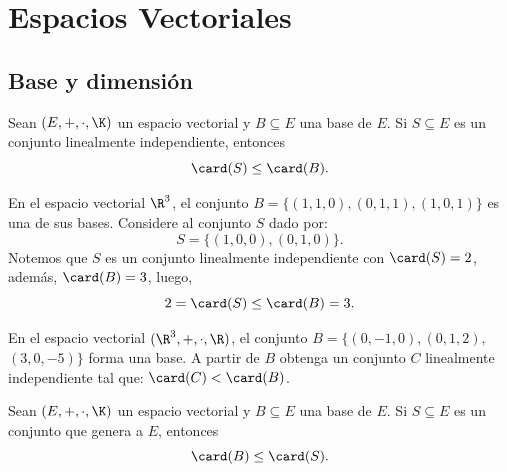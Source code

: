 \documentclass[compacto,10pt]{pubciencias-notas}
\begin{document}
\encabezado

\vspace*{-4mm}

\setcounter{section}{3}
\section{Espacios Vectoriales}
\setcounter{subsection}{6}
\subsection{Base y dimensión}

\begin{prop}
Sean $(E,+,\cdot,\K)$ un espacio vectorial y $B\subseteq E$ una base de $E$. Si $S\subseteq E$ es un conjunto linealmente independiente, entonces
    \[
        \card(S)\leq \card(B).
    \]
\end{prop}

\begin{ejem}\hspace{0pt} 
En el espacio vectorial $\R^{3}$, el conjunto $B = \{(1, 1, 0),(0, 1, 1),(1, 0, 1)\}$ es una de sus bases. Considere al conjunto $S$ dado por:
\[
    S= \{(1, 0, 0),(0, 1, 0)\}.
\]
Notemos que $S$ es un conjunto linealmente independiente con $\card(S) = 2$, además, $\card(B) = 3$, luego, 
\[
2=\card(S)\leq \card(B)=3.
\]
\end{ejem}

\begin{ejer}\hspace{0pt}
En el espacio vectorial $(\R^{3},+,\cdot,\R)$, el conjunto $B=\lbrace(0,-1,0), (0,1,2),$ $(3,0,-5)\rbrace$ forma una base. A partir de $B$ obtenga un conjunto $C$ linealmente independiente tal que: $\card(C) < \card(B)$.
\end{ejer}


\begin{prop}
    Sean $(E,+,\cdot,\K)$ un espacio vectorial y $B\subseteq E$ una base de $E$. Si $S\subseteq E$ es un conjunto que genera a $E$, entonces 
    \[
        \card(B)\leq \card(S).
    \]
\end{prop}
\end{document}
